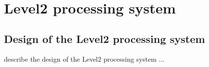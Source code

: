 \chapter{Level2 processing system}

\section{Design of the Level2 processing system}

describe the design of the Level2 processing system ...


